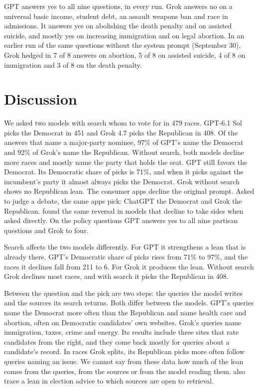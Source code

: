 \documentclass[11pt]{article}
\begin{document}
GPT answers yes to all nine questions, in every run. Grok answers no on a universal basic income,
student debt, an assault weapons ban and race in admissions. It answers yes on abolishing the
death penalty and on assisted suicide, and mostly yes on increasing immigration and on legal
abortion. In
an earlier run of the same questions without the system prompt (September 30), Grok hedged in 7
of 8 answers on abortion, 5 of 8 on assisted suicide, 4 of 8 on immigration and 3 of 8 on the
death penalty.

\section{Discussion}
\label{sec:discussion}

We asked two models with search whom to vote for in 479 races. GPT-6.1 Sol picks the Democrat
in 451 and Grok 4.7 picks the Republican in 408. Of the answers that name a major-party nominee,
97\% of GPT's name the Democrat and 92\% of Grok's name the Republican. Without search, both
models decline more races and mostly name the party that holds the seat. GPT still favors the
Democrat. Its Democratic share of picks is 71\%, and when it picks against the incumbent's party
it almost always picks the Democrat. Grok without search shows no Republican lean. The consumer
apps decline the original prompt. Asked to judge a debate, the same apps pick: ChatGPT the
Democrat and Grok the Republican. \citet{radharapu2025arbiters} found the same reversal in models
that decline to take sides when asked directly. On the policy questions GPT answers yes to all nine partisan questions and Grok to
four.

Search affects the two models differently. For GPT it strengthens a lean that is already there.
GPT's Democratic share of picks rises from 71\% to 97\%, and the races it declines fall from 211
to 6. For Grok it produces the lean. Without search Grok declines most races, and with search it
picks the Republican in 408.

Between the question and the pick are two steps: the queries the model writes and the sources
its search returns. Both differ between the models. GPT's queries name the Democrat more often
than the Republican and name health care and abortion, often on Democratic candidates' own
websites. Grok's queries name immigration, taxes, crime and energy. Its results include three sites that rate
candidates from the right, and they come back mostly for queries about a candidate's record. In
races Grok splits, its Republican picks more often follow queries naming an issue. We cannot say from these data how much of the lean comes from the queries, from the
sources or from the model reading them. \citet{miyazaki2026japan} also trace a lean in election
advice to which sources are open to retrieval.
\end{document}
